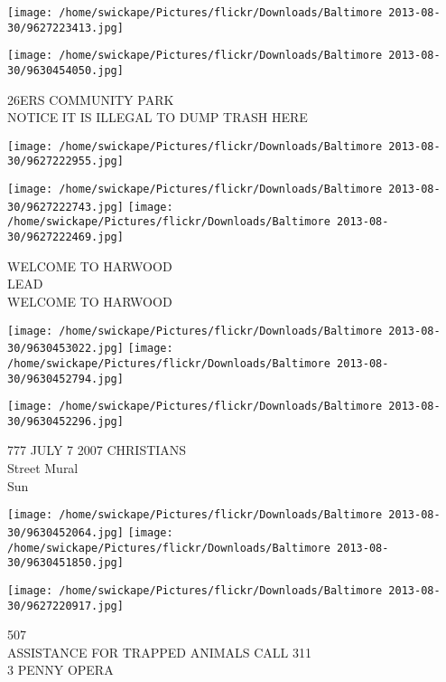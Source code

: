 \documentclass[10pt,letterpaper]{article}
\begin{document}
\texttt{[image: /home/swickape/Pictures/flickr/Downloads/Baltimore 2013-08-30/9627223413.jpg]}

\vspace{0.25in}
\texttt{[image: /home/swickape/Pictures/flickr/Downloads/Baltimore 2013-08-30/9630454050.jpg]}

26ERS COMMUNITY PARK\\
NOTICE IT IS ILLEGAL TO DUMP TRASH HERE\\
\pagebreak

\texttt{[image: /home/swickape/Pictures/flickr/Downloads/Baltimore 2013-08-30/9627222955.jpg]}

\vspace{0.25in}
\texttt{[image: /home/swickape/Pictures/flickr/Downloads/Baltimore 2013-08-30/9627222743.jpg]}
\texttt{[image: /home/swickape/Pictures/flickr/Downloads/Baltimore 2013-08-30/9627222469.jpg]}

WELCOME TO HARWOOD\\
LEAD\\
WELCOME TO HARWOOD\\
\pagebreak

\texttt{[image: /home/swickape/Pictures/flickr/Downloads/Baltimore 2013-08-30/9630453022.jpg]}
\texttt{[image: /home/swickape/Pictures/flickr/Downloads/Baltimore 2013-08-30/9630452794.jpg]}

\vspace{0.25in}
\texttt{[image: /home/swickape/Pictures/flickr/Downloads/Baltimore 2013-08-30/9630452296.jpg]}

777 JULY 7 2007 CHRISTIANS\\
Street Mural\\
Sun\\
\pagebreak

\texttt{[image: /home/swickape/Pictures/flickr/Downloads/Baltimore 2013-08-30/9630452064.jpg]}
\texttt{[image: /home/swickape/Pictures/flickr/Downloads/Baltimore 2013-08-30/9630451850.jpg]}

\texttt{[image: /home/swickape/Pictures/flickr/Downloads/Baltimore 2013-08-30/9627220917.jpg]}

507\\
ASSISTANCE FOR TRAPPED ANIMALS CALL 311\\
3 PENNY OPERA\\
\pagebreak
\end{document}

